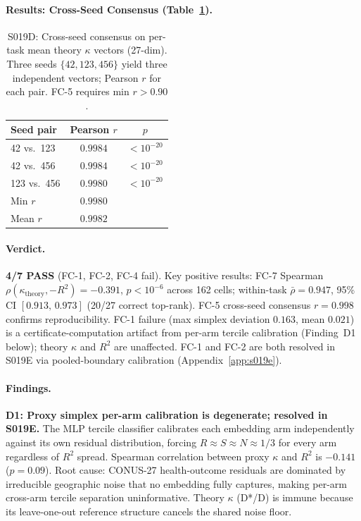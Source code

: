 \documentclass{article}
\begin{document}
\paragraph{Results: Cross-Seed Consensus (Table~\ref{tab:s019d_cross_seed}).}

\begin{table}[htbp]
\centering
\small
\caption{S019D: Cross-seed consensus on per-task mean theory $\kappa$ vectors (27-dim). Three seeds $\{42, 123, 456\}$ yield three independent vectors; Pearson $r$ for each pair. FC-5 requires min $r > 0.90$.}
\label{tab:s019d_cross_seed}
\begin{tabular}{l|cc}
\toprule
\textbf{Seed pair} & Pearson $r$ & $p$ \\
\midrule
42 vs.\ 123   & $0.9984$ & $< 10^{-20}$ \\
42 vs.\ 456   & $0.9984$ & $< 10^{-20}$ \\
123 vs.\ 456  & $0.9980$ & $< 10^{-20}$ \\
\midrule
Min $r$ & $0.9980$ & \\
Mean $r$ & $0.9982$ & \\
\bottomrule
\end{tabular}
\end{table}

\paragraph{Verdict.} \textbf{4/7 PASS} (FC-1, FC-2, FC-4 fail). Key positive results: FC-7 Spearman $\rho(\kappa_{\text{theory}}, -R^2) = -0.391$, $p < 10^{-6}$ across 162 cells; within-task $\bar\rho = 0.947$, 95\% CI $[0.913,\, 0.973]$ (20/27 correct top-rank). FC-5 cross-seed consensus $r = 0.998$ confirms reproducibility. FC-1 failure (max simplex deviation $0.163$, mean $0.021$) is a certificate-computation artifact from per-arm tercile calibration (Finding~D1 below); theory $\kappa$ and $R^2$ are unaffected. FC-1 and FC-2 are both resolved in S019E via pooled-boundary calibration (Appendix~\ref{app:s019e}).

\paragraph{Findings.}

\textbf{D1: Proxy simplex per-arm calibration is degenerate; resolved in S019E.}
The MLP tercile classifier calibrates each embedding arm independently against its own residual distribution, forcing $R \approx S \approx N \approx 1/3$ for every arm regardless of $R^2$ spread. Spearman correlation between proxy $\kappa$ and $R^2$ is $-0.141$ ($p = 0.09$). Root cause: CONUS-27 health-outcome residuals are dominated by irreducible geographic noise that no embedding fully captures, making per-arm cross-arm tercile separation uninformative. Theory $\kappa$ (D*/D) is immune because its leave-one-out reference structure cancels the shared noise floor.
\end{document}
